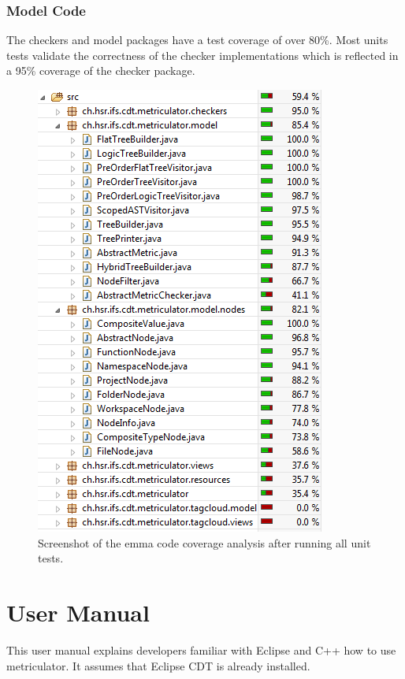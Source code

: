 \documentclass[11pt,a4paper,oneside]{scrreprt}
\begin{document}
\subsection{Model Code}
The checkers and model packages have a test coverage of over 80\%. Most units tests validate the correctness of the checker implementations which is reflected in a 95\% coverage of the checker package.\\

\begin{figure}[th]
\begin{center}
\includegraphics{figures/emma_coverage.png}
\end{center}
\caption{Screenshot of the emma code coverage analysis after running all unit tests.}
\label{fig:emma}
\end{figure}

\chapter{User Manual}
This user manual explains developers familiar with Eclipse and C++ how to use metriculator. It assumes that Eclipse CDT is already installed.
\end{document}
